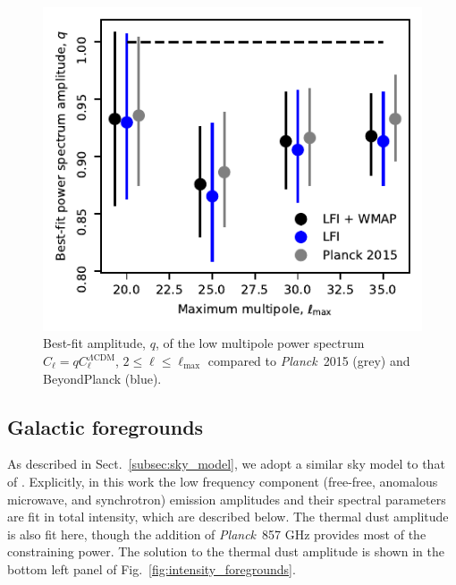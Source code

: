 \documentclass[twocolumn]{../../common/aa}
\def\WMAP{\emph{WMAP}}
\def\planck{\emph{Planck}}
\def\Planck{\emph{Planck}}
\begin{document}
\begin{figure}
	\includegraphics[width=\columnwidth]{figures/WMAP_best_q_fit.pdf}
	\caption{Best-fit amplitude, $q$, of the low multipole power spectrum $C_{\ell} = q C^{\Lambda \mathrm{CDM}}_{\ell}$, $2 \leq \ell \leq \ell_{\mathrm{max}}$ compared to \planck\ 2015 (grey) and BeyondPlanck (blue).}
\end{figure}


\subsection{Galactic foregrounds}\label{subsec:foregrounds}

As described in Sect.~\ref{subsec:sky_model}, we adopt a similar sky model to that of \cite{bp01}. Explicitly, in this work the low frequency component (free-free, anomalous microwave, and synchrotron) emission amplitudes and their spectral parameters are fit in total intensity, which are described below. The thermal dust amplitude is also fit here, though the addition of \Planck\ 857 GHz provides most of the constraining power. The solution to the thermal dust amplitude is shown in the bottom left panel of Fig.~\ref{fig:intensity_foregrounds}. %
\end{document}
